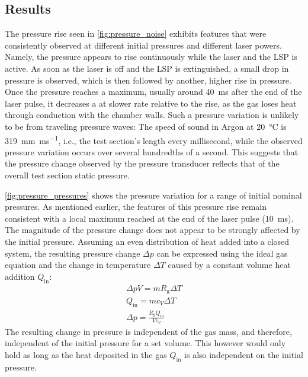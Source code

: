         \subsection{Results}
            The pressure rise seen in \autoref{fig:pressure_noise} exhibits features that were consistently observed at different initial pressures and different laser powers. Namely, the pressure appears to rise continuously while the laser and the LSP is active. As soon as the laser is off and the LSP is extinguished, a small drop in pressure is observed, which is then followed by another, higher rise in pressure. Once the pressure reaches a maximum, usually around \qty{40}{ms} after the end of the laser pulse, it decreases a at slower rate relative to the rise, as the gas loses heat through conduction with the chamber walls. Such a pressure variation is unlikely to be from traveling pressure waves: The speed of sound in Argon at \qty{20}{\degreeCelsius} is \qty{319}{mm.ms^{-1}}, i.e., the test section's length every millisecond, while the observed pressure variation occurs over several hundredths of a second. This suggests that the pressure change observed by the pressure transducer reflects that of the overall test section static pressure.

            \autoref{fig:pressure_pressures} shows the pressure variation for a range of initial nominal pressures. As mentioned earlier, the features of this pressure rise remain consistent with a local maximum reached at the end of the laser pulse (\qty{10}{ms}). The magnitude of the pressure change does not appear to be strongly affected by the initial pressure. Assuming an even distribution of heat added into a closed system, the resulting pressure change $\Delta p$ can be expressed using the ideal gas equation and the change in temperature $\Delta T$ caused by a constant volume heat addition $Q_\mathrm{in}$:
            \begin{gather*}
                \Delta pV = mR_\mathrm{g}\Delta T \\
                Q_\mathrm{in} = mc_V\Delta T \\
                \Delta p = \frac{R_\mathrm{g}Q_\mathrm{in}}{Vc_V}
            \end{gather*}
            The resulting change in pressure is independent of the gas mass, and therefore, independent of the initial pressure for a set volume. This however would only hold as long as the heat deposited in the gas $Q_\mathrm{in}$ is also independent on the initial pressure.

